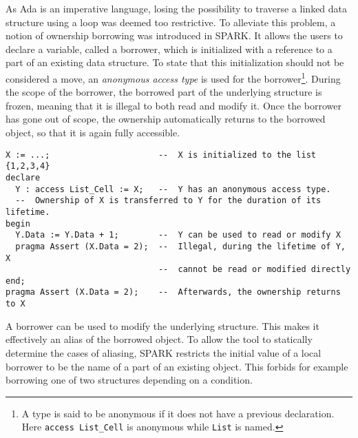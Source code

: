 \documentclass[runningheads]{llncs}
\begin{document}
As Ada is an imperative language, losing the possibility to traverse a linked data structure using a loop was deemed too restrictive. To alleviate this problem, a notion of ownership borrowing was introduced in SPARK. It allows the users to declare a variable, called a borrower, which is initialized with a reference to a part of an existing data structure. To state that this initialization should not be considered a move, an \emph{anonymous access type} is used for the borrower\footnote{A type is said to be anonymous if it does not have a previous declaration. Here \texttt{access List\_Cell} is anonymous while \texttt{List} is named.}. During the scope of the borrower, the borrowed part of the underlying structure is frozen, meaning that it is illegal to both read and modify it. %
Once the borrower has gone out of scope, the ownership automatically returns to the borrowed object, so that it is again fully accessible.
\begin{lstlisting}
X := ...;                      --  X is initialized to the list {1,2,3,4}
declare
  Y : access List_Cell := X;   --  Y has an anonymous access type.
  --  Ownership of X is transferred to Y for the duration of its lifetime.
begin
  Y.Data := Y.Data + 1;        --  Y can be used to read or modify X
  pragma Assert (X.Data = 2);  --  Illegal, during the lifetime of Y, X
                               --  cannot be read or modified directly
end;
pragma Assert (X.Data = 2);    --  Afterwards, the ownership returns to X
\end{lstlisting}
A borrower can be used to modify the underlying structure. This makes it effectively an alias of the borrowed object. To allow the tool to statically determine the cases of aliasing, SPARK restricts the initial value of a local borrower to be the name of a part of an existing object. This forbids for example borrowing one of two structures depending on a condition.
\end{document}
